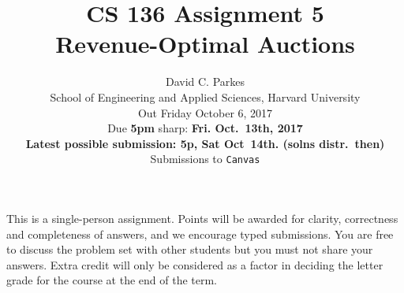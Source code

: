 \documentclass[11pt]{article}
\begin{document}
\title{CS 136 Assignment 5\\
Revenue-Optimal Auctions}
\author{David C. Parkes  \\School of Engineering and Applied Sciences, Harvard University\\Out Friday October 6,  2017\\
Due {\bf 5pm} sharp: {\bf Fri. Oct.~13th, 2017}\\
{\bf Latest possible submission: 5p, Sat Oct~14th. (solns distr.~then)}\\
Submissions to \texttt{Canvas}}
\date{}

\maketitle

This is a single-person assignment.
Points will be awarded for clarity, correctness and completeness of
answers, and we encourage typed submissions. You are free to discuss
the problem set with other students but you must not share your
answers.  Extra credit will only be considered as a factor in deciding
the letter grade for the course at the end of the term.
\end{document}
